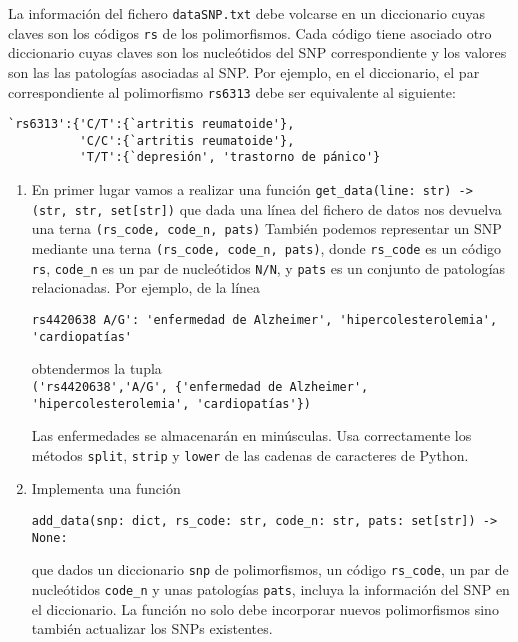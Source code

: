 \documentclass[a4paper,10pt]{article}
\begin{document}
        La información del fichero \lstinline{dataSNP.txt} debe volcarse en un diccionario cuyas claves son los códigos \lstinline{rs} de los polimorfismos. Cada código tiene asociado otro diccionario cuyas claves son los nucleótidos del SNP correspondiente y los valores son las las patologías asociadas al SNP. Por ejemplo, en el diccionario, el par correspondiente al polimorfismo \lstinline{rs6313} debe ser equivalente al siguiente:\\
        \hspace*{3ex}
\begin{lstlisting}
`rs6313':{'C/T':{`artritis reumatoide'},
          'C/C':{`artritis reumatoide'},
          'T/T':{`depresión', 'trastorno de pánico'}
\end{lstlisting}


%
\begin{enumerate}

\item En primer lugar vamos a realizar una función
  \lstinline|get_data(line: str) -> (str, str, set[str])|
  que dada una línea
  del fichero de datos nos devuelva una terna  \lstinline{(rs_code, code_n, pats)}
  También podemos representar un SNP mediante una terna
  \lstinline{(rs_code, code_n, pats)}, donde \lstinline{rs_code} es un
  código \lstinline{rs}, \lstinline{code_n} es un par de nucleótidos
  \lstinline{N/N}, y \lstinline{pats} es un conjunto de patologías
  relacionadas. Por ejemplo, de la línea
\begin{lstlisting}[]
rs4420638 A/G': 'enfermedad de Alzheimer', 'hipercolesterolemia', 'cardiopatías'
\end{lstlisting}
  obtendermos la tupla\\
  \lstinline|('rs4420638','A/G', {'enfermedad de Alzheimer', 'hipercolesterolemia', 'cardiopatías'})|

  Las enfermedades se almacenarán en minúsculas. Usa correctamente los
  métodos \lstinline|split|, \lstinline|strip| y \lstinline|lower| de
  las cadenas de caracteres de Python.

\item
  Implementa una función
\begin{lstlisting}
add_data(snp: dict, rs_code: str, code_n: str, pats: set[str]) -> None:
\end{lstlisting}
  que dados un diccionario \lstinline{snp} de polimorfismos, un código
  \lstinline|rs_code|, un par de nucleótidos \lstinline|code_n| y unas
  patologías \lstinline|pats|,
  incluya la información del SNP en el diccionario. La función no solo debe incorporar nuevos polimorfismos sino también actualizar los SNPs existentes.


\end{enumerate}
\end{document}
